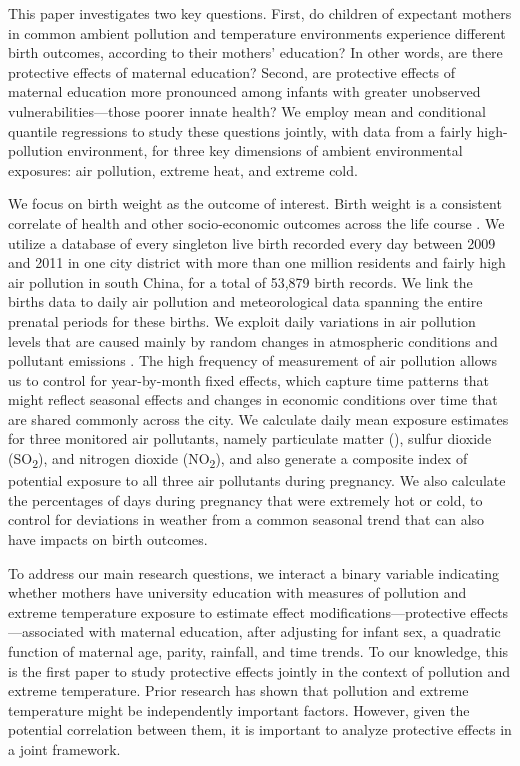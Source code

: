 This paper investigates two key questions. First, do children of expectant mothers in
common ambient pollution and temperature environments experience
different birth outcomes, according to their mothers' education? In other words,
are there protective effects of maternal education? Second, are
protective effects of maternal education more pronounced among infants with greater unobserved vulnerabilities---those poorer innate health? We employ mean and conditional quantile regressions to study these questions jointly, with data from a fairly high-pollution environment, for three key dimensions of ambient environmental exposures: air pollution, extreme heat, and extreme cold. 

We focus on birth weight as the outcome of
interest. Birth weight is a consistent correlate of health and other
socio-economic outcomes across the life course \autocite{behrman_returns_2004, black_cradle_2007, behrman_cross-sectional_2015, komlos_pound_2016}. We utilize a database of every 
singleton live birth recorded every day between 2009 and 2011 in one city district with more than one million residents and fairly high air pollution in south
China, for a total of 53,879 birth records. We link the births data
to daily air pollution and meteorological data spanning the entire
prenatal periods for these births. We exploit daily variations in air pollution levels that are caused mainly by random changes in atmospheric conditions and pollutant emissions \autocite{janke_air_2014, he_severe_2019}. The high frequency of measurement of air pollution allows us to control for year-by-month fixed effects, which capture time patterns that might reflect seasonal effects and changes in economic conditions over time that are shared commonly across the city. We calculate daily mean exposure estimates for three monitored air
pollutants, namely particulate matter (\PARPMTEN), sulfur dioxide (SO\textsubscript{2}), and nitrogen dioxide (NO\textsubscript{2}), and also generate a composite index of potential exposure
to all three air pollutants during pregnancy. We also calculate the percentages of days during pregnancy that were extremely hot or cold, to control for deviations in weather from a common seasonal trend that can also have impacts on birth outcomes.

To address our main research questions, we interact a binary variable indicating whether mothers have university education with measures of pollution and extreme temperature exposure to estimate effect
modifications---protective effects---associated with maternal education,
after adjusting for infant sex, a quadratic function of maternal age,
parity, rainfall, and time trends. To our knowledge, this is the first paper to study protective effects jointly in the context of pollution and extreme temperature. Prior research has shown that pollution and extreme temperature might be independently important factors. However, given the potential correlation between them, it is important to analyze protective effects in a joint framework. 

